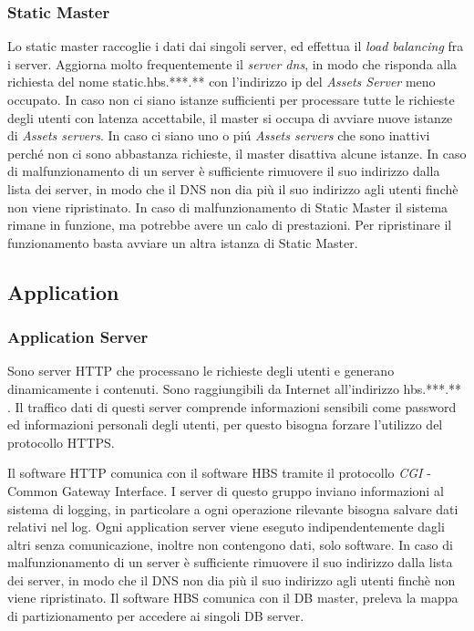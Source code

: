 \subsubsection{Static Master}
Lo static master raccoglie i dati dai singoli server, ed effettua il \emph{load balancing} fra i server.
Aggiorna molto frequentemente il \emph{server dns}, in modo che risponda alla richiesta del nome static.hbs.***.** con l'indirizzo ip del \emph{Assets Server} meno occupato.
In caso non ci siano istanze sufficienti per processare tutte le richieste degli utenti con latenza accettabile, il master si occupa di avviare nuove istanze di \emph{Assets servers}.
In caso ci siano uno o pi\'u \emph{Assets servers} che sono inattivi perch\'e non ci sono abbastanza richieste, il master disattiva alcune istanze.
In caso di malfunzionamento di un server \`e sufficiente rimuovere il suo indirizzo dalla lista dei server, in modo che il DNS non dia pi\`u il suo indirizzo agli utenti finch\`e non viene ripristinato.
In caso di malfunzionamento di Static Master il sistema rimane in funzione, ma potrebbe avere un calo di prestazioni.
Per ripristinare il funzionamento basta avviare un altra istanza di Static Master.
\subsection{Application}

\subsubsection{Application Server}
Sono server HTTP che processano le richieste degli utenti e generano dinamicamente i contenuti.
Sono raggiungibili da Internet all'indirizzo hbs.***.** .
Il traffico dati di questi server comprende informazioni sensibili come password ed informazioni personali degli utenti, per questo bisogna forzare l'utilizzo del protocollo HTTPS.

Il software HTTP comunica con il software HBS tramite il protocollo \emph{CGI} - Common Gateway Interface.
I server di questo gruppo inviano informazioni al sistema di logging, in particolare a ogni operazione rilevante bisogna salvare dati relativi nel log.
Ogni application server viene eseguto indipendentemente dagli altri senza comunicazione, inoltre non contengono dati, solo software.
In caso di malfunzionamento di un server \`e sufficiente rimuovere il suo indirizzo dalla lista dei server, in modo che il DNS non dia pi\`u il suo indirizzo agli utenti finch\`e non viene ripristinato.
Il software HBS comunica con il DB master, preleva la mappa di partizionamento per accedere ai singoli DB server.
